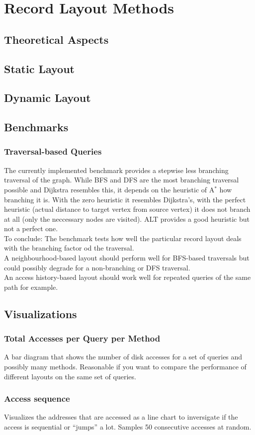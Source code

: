 \section{Record Layout Methods}

\subsection{Theoretical Aspects}

\subsection{Static Layout}

\subsection{Dynamic Layout}

 \subsection{Benchmarks}
    \subsubsection{Traversal-based Queries}
    The currently implemented benchmark provides a stepwise less branching traversal of the graph. While BFS and DFS are the most branching traversal possible and Dijkstra resembles this, it depends on the heuristic of A$^*$ how branching it is. With the zero heuristic it resembles Dijkstra's, with the perfect heuristic (actual distance to target vertex from source vertex) it does not branch at all (only the neccessary nodes are visited). ALT provides a good heuristic but not a perfect one. \\
    To conclude: The benchmark tests how well the particular record layout deals with the branching factor od the traversal. \\
    A neighbourhood-based layout should perform well for BFS-based traversals but could possibly degrade for a non-branching or DFS traversal. \\
    An access history-based layout should work well for repeated queries of the same path for example.
    
    
 \subsection{Visualizations}
    \subsubsection{Total Accesses per Query per Method}
    A bar diagram that shows the number of disk accesses for a set of queries and possibly many methods. Reasonable if you want to compare the performance of different layouts on the same set of queries.
    
    \subsubsection{Access sequence} Visualizes the addresses that are accessed as a line chart to inversigate if the access is sequential or ``jumps'' a lot. Samples 50 consecutive accesses at random.



